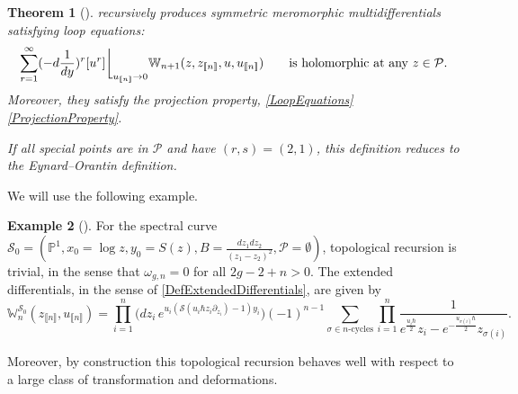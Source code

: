\documentclass[10pt,a4paper,oneside,no-math,reqno]{amsart}%
\theoremstyle{plain}
\newtheorem{theorem}{Theorem}[section]
\theoremstyle{definition}
\newtheorem{example}[theorem]{Example}
\theoremstyle{remark}
\numberwithin{equation}{section}
\newcommand{\mb}[1]{\mathbb{#1}}
\newcommand{\mc}[1]{\mathcal{#1}}
\newcommand{\1}{\mathds{1}}
\renewcommand{\P}{\mb{P}}
\newcommand{\<}{\langle}
\renewcommand{\>}{\rangle}
\newcommand{\del}{\partial}
\begin{document}
\begin{theorem}[{\cite{ABDKS25}}]
     recursively produces symmetric meromorphic multidifferentials satisfying \emph{loop equations}:
    \begin{equation}
       \sum_{r = 1}^\infty ( - d \frac{1}{dy} )^r [u^r] \bigg\lfloor_{u_{\llbracket n \rrbracket} \to 0} \mb{W}_{n+1} ( z, z_{\llbracket n \rrbracket}, u, u_{\llbracket n \rrbracket})
       \qquad
       \text{is holomorphic at any $ z \in \mc{P}$.}
    \end{equation}
    Moreover, they satisfy the projection property, \cref{LoopEquations} \cref{ProjectionProperty}.\par
    If all special points are in $ \mc{P}$ and have $ (r,s) = (2,1)$, this definition reduces to the Eynard--Orantin definition.
\end{theorem}

We will use the following example.

\begin{example}[{\cite[(15)]{ABDKS24}}]\label{TrivialTR}
    For the spectral curve $\mc{S}_0 = (\P^1, x_0 = \log z, y_0 = S(z), B = \frac{dz_1 dz_2}{(z_1 - z_2)^2}, \mc{P} = \emptyset)$, topological recursion is trivial, in the sense that $ \omega_{g,n} = 0$ for all $ 2g - 2 + n > 0$. The extended differentials, in the sense of \cref{DefExtendedDifferentials}, are given by
    \begin{equation}
	   \mb{W}_n^{\mc{S}_0} (z_{\llbracket n\rrbracket}, u_{\llbracket n\rrbracket}) 
	   =
	   \prod_{i=1}^n \Big( dz_i \, e^{u_i (\mc{S}(u_i \hbar z_i \del_{z_i}) - 1) y_i} \Big) (-1)^{n-1} \!\!\! \sum_{\sigma \in n\text{-cycles}} \prod_{i=1}^n \frac{1}{e^{\frac{u_i \hbar}{2}} z_i - e^{-\frac{u_{\sigma (i)} \hbar }{2}} z_{\sigma (i)}} .
    \end{equation}
\end{example}

Moreover, by construction this topological recursion behaves well with respect to a large class of transformation and deformations.
\end{document}
